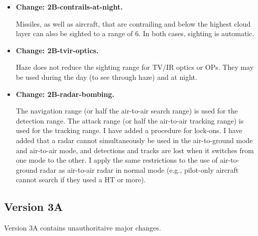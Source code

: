 \documentclass[10pt]{report}
\newcommand{\itemtag}[1]{\item \textbf{Change: #1.}\par}
\begin{document}
\begin{itemize}
    \itemtag{2B-contrails-at-night} Missiles, as well as aircraft, that are contrailing and below the highest cloud layer can also be sighted to a range of 6. In both cases, sighting is automatic.
    
    \itemtag{2B-tvir-optics} Haze does not reduce the sighting range for TV/IR optics or OPs. They may be used during the day (to see through haze) and at night.
    
    \itemtag{2B-radar-bombing} The navigation range (or half the air-to-air search range) is used for the detection range. The attack range (or half the air-to-air tracking range) is used for the tracking range. I have added a procedure for lock-ons. I have added that a radar cannot simultaneously be used in the air-to-ground mode and air-to-air mode, and detections and tracks are lost when it switches from one mode to the other. I apply the same restrictions to the use of air-to-ground radar as air-to-air radar in normal mode (e.g., pilot-only aircraft cannot search if they used a HT or more).

\end{itemize}

\subsection{Version 3A}

Version 3A contains unauthoritaive major changes.
\end{document}
